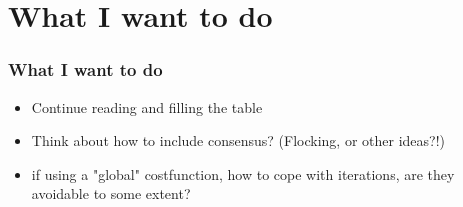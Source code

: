 \section{What I want to do}

\begin{frame}	\frametitle{What I want to do}
	\begin{itemize}
		\item Continue reading and filling the table
		\item Think about how to include consensus? (Flocking, or other ideas?!) \cite{EiHoWe13d,ElAh07}
		\item if using a "global" costfunction, how to cope with iterations, are they avoidable to some extent?
	\end{itemize}
\end{frame}